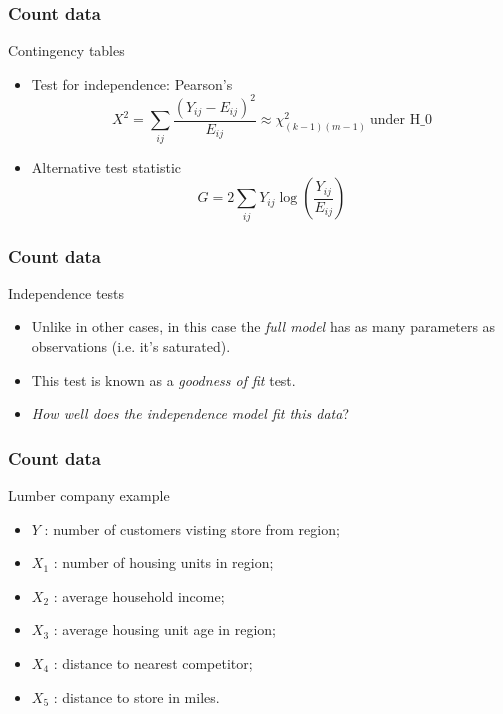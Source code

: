 \documentclass[handout]{beamer}
\begin{document}
   \begin{frame} \frametitle{Count data}

   \begin{block}
       {Contingency tables}
       \begin{itemize}
    \item Test for independence: Pearson's
   $$
   X^2 = \sum_{ij} \frac{(Y_{ij}-E_{ij})^2}{E_{ij}} \approx \chi^2_{(k-1)(m-1)} \  \text{under H_0}$$


       \item Alternative test statistic
   $$
   G = 2\sum_{ij} Y_{ij} \log \left(\frac{Y_{ij}}{E_{ij}}\right)$$
       \end{itemize}
   \end{block}
   \end{frame}


   \begin{frame} \frametitle{Count data}

   \begin{block}
       {Independence tests}
       \begin{itemize}[<+->]
       \item Unlike in other cases, in this case the {\em full model}
       has as many parameters as observations (i.e. it's saturated).

       \item This test is known as a {\em goodness of fit} test.
       \item {\em How well does the independence model fit this data}?
       \end{itemize}
   \end{block}
   \end{frame}


   \begin{frame} \frametitle{Count data}

   \begin{block}
       {Lumber company example}
       \begin{itemize}
       \item $Y$ : number of customers visting store from region;

    \item $X_1$ : number of housing units in region;

    \item $X_2$ : average household income;

    \item $X_3$ : average housing unit age in region;

    \item $X_4$ : distance to nearest competitor;

    \item $X_5$ : distance to store in miles.

       \end{itemize}
   \end{block}
   \end{frame}
\end{document}
